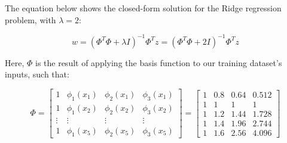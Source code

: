 \documentclass[12pt]{article}
\begin{document}
\begin{enumerate}[leftmargin=\labelsep]
        The equation below shows the closed-form solution for the Ridge regression
        problem, with $\lambda = 2$:

        \begin{equation*}
          w = (\Phi^T \Phi + \lambda I)^{-1} \Phi^T z = (\Phi^T \Phi + 2 I)^{-1} \Phi^T z
        \end{equation*}

        Here, $\Phi$ is the result of applying the basis function to our training
        dataset's inputs, such that:

        \begin{equation*}
          \Phi = \begin{bmatrix}
            1      & \phi_1(x_1) & \phi_2(x_1) & \phi_3(x_1) \\
            1      & \phi_1(x_2) & \phi_2(x_2) & \phi_3(x_2) \\
            \vdots & \vdots      & \vdots      & \vdots      \\
            1      & \phi_1(x_5) & \phi_2(x_5) & \phi_3(x_5)
          \end{bmatrix} = \begin{bmatrix}
            1 & 0.8 & 0.64 & 0.512 \\
            1 & 1   & 1    & 1     \\
            1 & 1.2 & 1.44 & 1.728 \\
            1 & 1.4 & 1.96 & 2.744 \\
            1 & 1.6 & 2.56 & 4.096
          \end{bmatrix}
        \end{equation*}


\end{enumerate}
\end{document}

